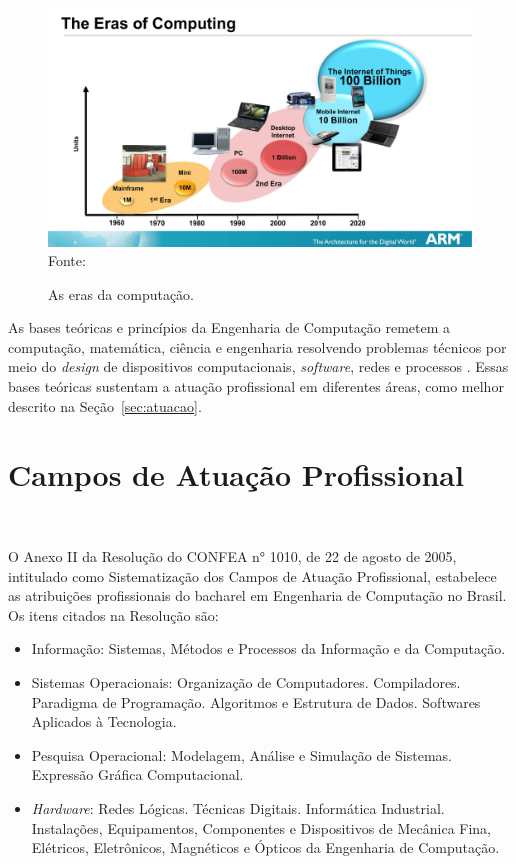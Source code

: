 \begin{figure}[H]
    \centering
    \caption{As eras da computação.}
    \label{fig:eras}
    \includegraphics[width=\textwidth]{enc/imagens/CompEras.pdf}
    Fonte:~\textcite{ARM2013}
\end{figure}


As bases teóricas e princípios da Engenharia de Computação remetem a computação, matemática, ciência e engenharia resolvendo problemas técnicos por meio do \textit{design} de dispositivos computacionais, \textit{software}, redes e processos \cite{CE2016}. Essas bases teóricas sustentam a atuação profissional em diferentes áreas, como melhor descrito na Seção~\ref{sec:atuacao}.


\section{Campos de Atuação Profissional}~\label{sec:atuacao}


O Anexo II da Resolução do CONFEA n° 1010, de 22 de agosto de 2005, intitulado como Sistematização dos Campos de Atuação Profissional, estabelece as atribuições profissionais do bacharel em Engenharia de Computação no Brasil. Os itens citados na Resolução são:
\begin{itemize}
    \item Informação: Sistemas, Métodos e Processos da Informação e da Computação.
    \item Sistemas Operacionais: Organização de Computadores. Compiladores.
    Paradigma de Programação. Algoritmos e Estrutura de Dados. Softwares Aplicados à Tecnologia.
    \item Pesquisa Operacional: Modelagem, Análise e Simulação de Sistemas. Expressão Gráfica Computacional.
    \item \textit{Hardware}: Redes Lógicas. Técnicas Digitais. Informática Industrial.
    Instalações, Equipamentos, Componentes e Dispositivos de Mecânica Fina, Elétricos, Eletrônicos, Magnéticos e Ópticos da Engenharia de Computação.
\end{itemize}


